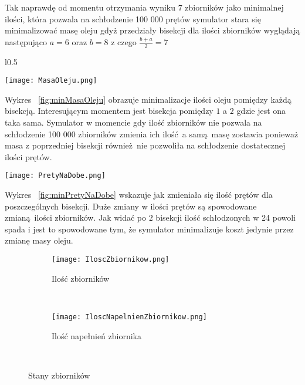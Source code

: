 \documentclass[varwidth,12pt,a4paper]{article}
\begin{document}
Tak naprawdę od momentu otrzymania wyniku $7$ zbiorników jako minimalnej ilości, która pozwala na
schłodzenie 100 000 prętów symulator stara się minimalizować masę oleju gdyż przedziały bisekcji
dla ilości zbiorników wyglądają następująco $a = 6$ oraz $b = 8$ z czego $\frac{b + a}{2} = 7$

\begin{wrapfigure}{l}{0.5\textwidth}
  \vspace{-20pt}
  \begin{center}
    \texttt{[image: MasaOleju.png]}
    \label{fig:minMasaOleju}
  \end{center}
  \vspace{-20pt}
  \caption{Masa oleju}
  \vspace{30pt}
\end{wrapfigure}

Wykres ~\ref{fig:minMasaOleju} obrazuje minimalizacje ilości oleju pomiędzy każdą bisekcją.
Interesującym momentem jest bisekcja pomiędzy $1$ a $2$ gdzie jest ona taka sama. Symulator w momencie 
gdy ilość zbiorników nie pozwala na schłodzenie 100 000 zbiorników zmienia ich ilość a samą masę
zostawia ponieważ masa z poprzedniej bisekcji również nie pozwoliła na schłodzenie dostatecznej
ilości prętów.

  \begin{center}
    \texttt{[image: PretyNaDobe.png]}
    \label{fig:minPretyNaDobe}
    \caption{Ilość prętów na dobę}
  \end{center}

Wykres ~\ref{fig:minPretyNaDobe} wskazuje jak zmieniała się ilość prętów dla poszczególnych bisekcji.
Duże zmiany w ilości prętów są spowodowane zmianą ilości zbiorników. Jak widać po $2$ bisekcji 
ilość schłodzonych w 24 powoli spada i jest to spowodowane tym, że symulator minimalizuje koszt
jedynie przez zmianę masy oleju. 

\begin{figure}
    \centering
    \begin{subfigure}[b]{0.4\textwidth}
        \texttt{[image: IloscZbiornikow.png]}
        \caption{Ilość zbiorników}
        \label{fig:minIloscZbiornikow}
    \end{subfigure}
    ~ %
    \begin{subfigure}[b]{0.4\textwidth}
        \texttt{[image: IloscNapelnienZbiornikow.png]}
        \caption{Ilość napełnień zbiornika}
        \label{fig:minIloscNapelnien}
    \end{subfigure}
    ~ %
    \caption{Stany zbiorników}
\end{figure}
\end{document}
